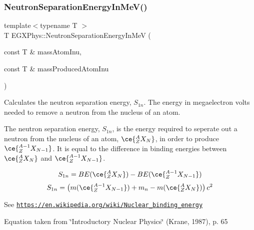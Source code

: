 \subsubsection{\texorpdfstring{Neutron\+Separation\+Energy\+In\+Me\+V()}{NeutronSeparationEnergyInMeV()}}
{\footnotesize\ttfamily template$<$typename T $>$ \\
T E\+G\+X\+Phys\+::\+Neutron\+Separation\+Energy\+In\+MeV (\begin{DoxyParamCaption}\item[{const T \&}]{mass\+Atom\+Inu,  }\item[{const T \&}]{mass\+Produced\+Atom\+Inu }\end{DoxyParamCaption})}



Calculates the neutron separation energy, $S_{1n}$. The energy in megaelectron volts needed to remove a neutron from the nucleus of an atom. 

The neutron separation energy, $S_{1n}$, is the energy required to seperate out a neutron from the nucleus of an atom, $\ce{ ^{A}_{Z}X_{N} }$, in order to produce $\ce{ ^{A-1}_{Z}X_{N-1} }$. It is equal to the difference in binding energies between $\ce{ ^{A}_{Z}X_{N} }$ and $\ce{ ^{A-1}_{Z}X_{N-1} }$.

\[S_{1n} = BE(\ce{ ^{A}_{Z}X_{N} }) - BE(\ce{ ^{A-1}_{Z}X_{N-1} })\] \[S_{1n} = \left ( m(\ce{ ^{A-1}_{Z}X_{N-1} }) + m_n - m(\ce{ ^{A}_{Z}X_{N} }) \right ) c^2\]

See \href{https://en.wikipedia.org/wiki/Nuclear_binding_energy}{\tt https\+://en.\+wikipedia.\+org/wiki/\+Nuclear\+\_\+binding\+\_\+energy}

Equation taken from \char`\"{}\+Introductory Nuclear Physics\char`\"{} (Krane, 1987), p. 65


